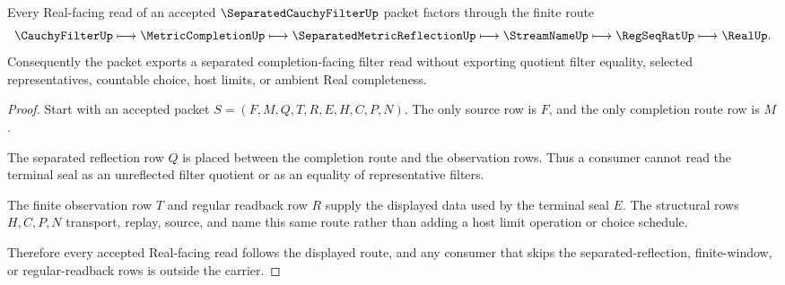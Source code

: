 \begin{theorem}
\label{thm:separated-cauchy-filter-reflection-soundness}
Every Real-facing read of an accepted $\SeparatedCauchyFilterUp$ packet factors through the finite route
$$
\CauchyFilterUp\longmapsto \MetricCompletionUp\longmapsto \SeparatedMetricReflectionUp\longmapsto \StreamNameUp\longmapsto \RegSeqRatUp\longmapsto \RealUp .
$$
Consequently the packet exports a separated completion-facing filter read without exporting quotient filter equality, selected representatives, countable choice, host limits, or ambient Real completeness.
\end{theorem}
\begin{proof}
Start with an accepted packet $S=(F,M,Q,T,R,E,H,C,P,N)$. The only source row is $F$, and the only completion route row is $M$.

The separated reflection row $Q$ is placed between the completion route and the observation rows. Thus a consumer cannot read the terminal seal as an unreflected filter quotient or as an equality of representative filters.

The finite observation row $T$ and regular readback row $R$ supply the displayed data used by the terminal seal $E$. The structural rows $H,C,P,N$ transport, replay, source, and name this same route rather than adding a host limit operation or choice schedule.

Therefore every accepted Real-facing read follows the displayed route, and any consumer that skips the separated-reflection, finite-window, or regular-readback rows is outside the carrier.
\end{proof}




